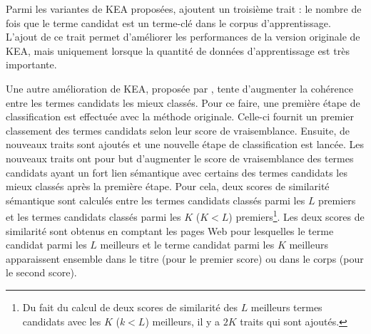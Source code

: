           Parmi les variantes de KEA proposées, \citet{frank1999keafrequency}
          ajoutent un troisième trait : le nombre de fois que le terme candidat est
          un terme-clé dans le corpus d'apprentissage. L'ajout de ce trait permet
          d'améliorer les performances de la version originale de KEA, mais
          uniquement lorsque la quantité de données d'apprentissage est très
          importante.
          
          Une autre amélioration de KEA, proposée par
          \citet{turney2003keacoherence}, tente d'augmenter la cohérence entre les
          termes candidats les mieux classés. Pour ce faire, une première étape de
          classification est effectuée avec la méthode originale. Celle-ci fournit
          un premier classement des termes candidats selon leur score de
          vraisemblance. Ensuite, de nouveaux traits sont ajoutés et une nouvelle
          étape de classification est lancée. Les nouveaux traits ont pour but
          d'augmenter le score de vraisemblance des termes candidats ayant un fort
          lien sémantique avec certains des termes candidats les mieux classés après la
          première étape. Pour cela, deux scores de similarité sémantique sont
          calculés entre les termes candidats classés parmi les $L$ premiers et les
          termes candidats classés parmi les $K$ ($K < L$) premiers\footnote{Du fait
          du calcul de deux scores de similarité des $L$ meilleurs termes candidats
          avec les $K$ ($k < L$) meilleurs, il y a $2K$ traits qui sont ajoutés.}.
          Les deux scores de similarité sont obtenus en comptant les pages Web pour
          lesquelles le terme candidat parmi les $L$ meilleurs et le terme candidat parmi les
          $K$ meilleurs apparaissent ensemble dans le titre (pour le premier score)
          ou dans le corps (pour le second score).

